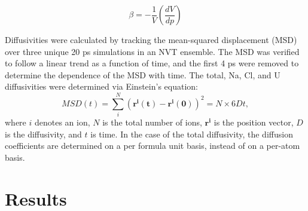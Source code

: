 \documentclass[preprint,3p,10pt,onecolumn,number,sort&compress]{elsarticle}
\begin{document}
\begin{equation}
\label{eq:compress}
\beta = -\frac{1}{V} {\left(\frac{dV}{dp}\right)}
\end{equation}

Diffusivities were calculated by tracking the mean-squared displacement (MSD) over three unique 20 ps simulations in an NVT ensemble. The MSD was verified to follow a linear trend as a function of time, and the first 4 ps were removed to determine the dependence of the MSD with time. The total, Na, Cl, and U diffusivities were determined via Einstein's equation:
\begin{equation}
MSD(t)=\sum_i^N (\mathbf{r^i(t)} - \mathbf{r^i(0)})^2 = N\times6Dt,
\end{equation}
where $i$ denotes an ion, $N$ is the total number of ions, $\mathbf{r^i}$ is the position vector, $D$ is the diffusivity, and $t$ is time. In the case of the total diffusivity, the diffusion coefficients are determined on a per formula unit basis, instead of on a per-atom basis. 

\section{Results}
\label{sec:results}
\end{document}
